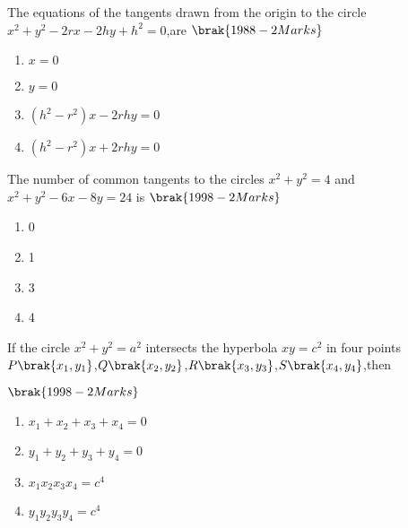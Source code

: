 \iffalse
\title{8.CIRCLE}
\author{EE24BTECH11023-RASAGNA}
\section{mcq-multiple}
\fi




\item The equations of the tangents drawn from the origin to the circle $x^2+y^2-2rx-2hy+h^2=0$,are
    \hfill$\brak{1988-2 Marks}$
    \begin{multicols}{2}
\begin{enumerate}
    \item $x=0$
    \item $y=0$
    \item $(h^2-r^2)x-2rhy=0$
    \item $(h^2-r^2)x+2rhy=0$
\end{enumerate}
\end{multicols}
\item The number of common tangents to the circles $x^2+y^2=4$ and $x^2+y^2-6x-8y=24$ is 
    \hfill$\brak{1998-2 Marks}$
    \begin{multicols}{2}
\begin{enumerate}
    \item 0
    \item 1 
    \item 3
    \item 4
\end{enumerate}
\end{multicols}
\item If the circle $x^2+y^2=a^2$ intersects the hyperbola $xy=c^2$ in four points $P\brak{x_1,y_1}$,$Q\brak{x_2,y_2}$,$R\brak{x_3,y_3}$,$S\brak{x_4,y_4}$,then

    \hfill$\brak{1998-2 Marks}$
\begin{multicols}{2}
\begin{enumerate}
    \item $x_1+x_2+x_3+x_4=0$
    \item $y_1+y_2+y_3+y_4=0$
    \item $x_1x_2x_3x_4=c^4$
    \item $y_1y_2y_3y_4=c^4$

\end{enumerate}
\end{multicols}

